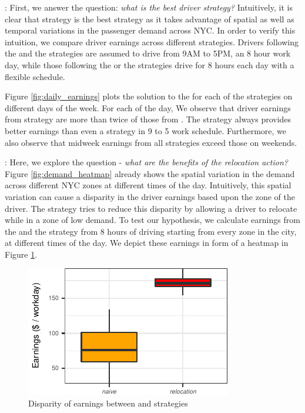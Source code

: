 : First, we answer the question: \textit{what is the best driver strategy?} Intuitively, it is clear that {\relocationflexible} strategy is the best strategy as it takes advantage of spatial as well as temporal variations in the passenger demand across NYC. In order to verify this intuition, we compare driver earnings across different strategies. Drivers following the {\naive} and the {\relocation} strategies are assumed to drive from 9AM to 5PM, an 8 hour work day, while those following the {\flexible} or the {\relocationflexible} strategies drive for 8 hours each day with a flexible schedule.

Figure \ref{fig:daily_earnings} plots the solution to the {\originalproblem} for each of the strategies on different days of the week. For each of the day, We observe that driver earnings from {\relocationflexible} strategy are more than twice of those from {\naive}. The {\flexible} strategy always provides better earnings than even a {\relocation} strategy in 9 to 5 work schedule. Furthermore, we also observe that midweek earnings from all strategies exceed those on weekends.

: Here, we explore the question - \textit{what are the benefits of the relocation action?} Figure \ref{fig:demand_heatmap} already shows the spatial variation in the demand across different NYC zones at different times of the day. Intuitively, this spatial variation can cause a disparity in the driver earnings based upon the zone of the driver. The {\relocation} strategy tries to reduce this disparity by allowing a driver to relocate while in a zone of low demand. To test our hypothesis, we calculate earnings from the {\naive} and the {\relocation} strategy from 8 hours of driving starting from every zone in the city, at different times of the day. We depict these earnings in form of a heatmap in Figure \ref{fig:earnings_heatmap}.

\begin{figure}
	\includegraphics{figures/earnings_heatmap.pdf}
	\caption{Disparity of earnings between {\naive} and {\relocation} strategies}
	\label{fig:earnings_heatmap}
\end{figure}

